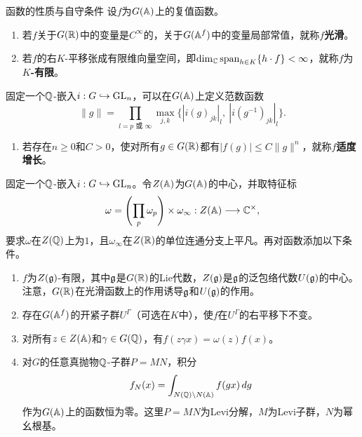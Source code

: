 \begin{definition}{函数的性质与自守条件}\label{L4S3O1}
设$f$为$G(\mathbb{A})$上的复值函数。
\begin{enumerate}[label=(\roman*)]
\item 若$f$关于$G(\mathbb{R})$中的变量是$C^\infty$的，关于$G(\mathbb{A}^f)$中的变量局部常值，就称$f$\textbf{光滑}。
\item 若$f$的右$K$-平移张成有限维向量空间，即$\dim_{\mathbb{C}}\operatorname{span}_{h\in K}\{h\cdot f\}<\infty$，就称$f$为\textbf{$K$-有限}。
\end{enumerate}
固定一个$\mathbb{Q}$-嵌入$i:G\hookrightarrow\operatorname{GL}_n$，可以在$G(\mathbb{A})$上定义范数函数
\[\|g\|=\prod_{l=p\text{ 或 }\infty}\max_{j,k}\{|i(g)_{jk}|_l,\ |i(g^{-1})_{jk}|_l\}.\]
\begin{enumerate}[label=(\roman*),start=3]
\item 若存在$n\geq0$和$C>0$，使对所有$g\in G(\mathbb{R})$都有$|f(g)|\leq C\|g\|^n$，就称$f$\textbf{适度增长}。
\end{enumerate}
固定一个$\mathbb{Q}$-嵌入$i:G\hookrightarrow\operatorname{GL}_n$。令$Z(\mathbb{A})$为$G(\mathbb{A})$的中心，并取特征标
\[\omega=\left(\prod_p\omega_p\right)\times\omega_\infty:Z(\mathbb{A})\longrightarrow\mathbb{C}^\times,\]
要求$\omega$在$Z(\mathbb{Q})$上为$1$，且$\omega_\infty$在$Z(\mathbb{R})$的单位连通分支上平凡。再对函数添加以下条件。
\begin{enumerate}[label=(\roman*),start=4]
\item $f$为$Z(\mathfrak{g})$-有限，其中$\mathfrak{g}$是$G(\mathbb{R})$的Lie代数，$Z(\mathfrak{g})$是$\mathfrak{g}$的泛包络代数$U(\mathfrak{g})$的中心。注意，$G(\mathbb{R})$在光滑函数上的作用诱导$\mathfrak{g}$和$U(\mathfrak{g})$的作用。
\item 存在$G(\mathbb{A}^f)$的开紧子群$U^\Gamma$（可选在$K$中），使$f$在$U^\Gamma$的右平移下不变。
\item 对所有$z\in Z(\mathbb{A})$和$\gamma\in G(\mathbb{Q})$，有$f(z\gamma x)=\omega(z)f(x)$。
\item 对$G$的任意真抛物$\mathbb{Q}$-子群$P=MN$，积分
\[f_N(x)=\int_{N(\mathbb{Q})\backslash N(\mathbb{A})}f(gx)\,dg\]
作为$G(\mathbb{A})$上的函数恒为零。这里$P=MN$为Levi分解，$M$为Levi子群，$N$为幂幺根基。
\end{enumerate}
\end{definition}
